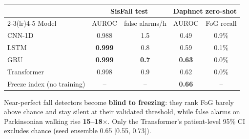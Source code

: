 \begin{tabular}{lcccc}
\toprule
 & \multicolumn{2}{c}{SisFall test} & \multicolumn{2}{c}{Daphnet zero-shot} \\
\cmidrule(lr){2-3}\cmidrule(lr){4-5}
Model & AUROC & false alarms/h & AUROC & FoG recall \\
\midrule
CNN-1D & 0.988 & 1.5 & 0.49 & 0.9\% \\
LSTM & \textbf{0.999} & 0.8 & 0.59 & 0.1\% \\
GRU & \textbf{0.999} & \textbf{0.7} & \textbf{0.63} & 0.0\% \\
Transformer & 0.998 & 0.9 & 0.62 & 0.0\% \\
\midrule
Freeze index (no training) & -- & -- & \textbf{0.66} & -- \\
\bottomrule
\end{tabular}

\vspace{0.8ex}
Near-perfect fall detectors become \textbf{blind to freezing}: they rank FoG barely above
chance and stay silent at their validated threshold, while false alarms on Parkinsonian walking rise
\textbf{15--18$\times$}. Only the Transformer's patient-level 95\% CI excludes chance
(seed ensemble 0.65 [0.55, 0.73]).
